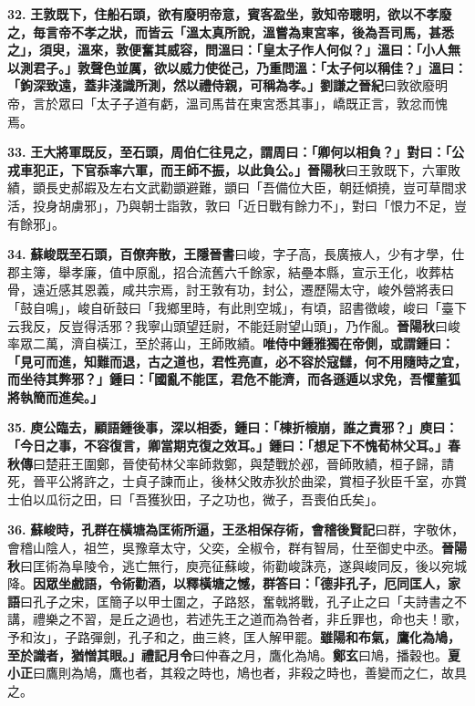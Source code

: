 \textbf{32.} \textbf{王敦既下，住船石頭，欲有廢明帝意，賓客盈坐，敦知帝聰明，欲以不孝廢之，毎言帝不孝之狀，而皆云「溫太真所說，溫嘗為東宮率，後為吾司馬，甚悉之」，須臾，溫來，敦便奮其威容，問溫曰：「皇太子作人何似？」溫曰：「小人無以測君子。」敦聲色並厲，欲以威力使從己，乃重問溫：「太子何以稱佳？」溫曰：「鉤深致遠，蓋非淺識所測，然以禮侍親，可稱為孝。」}{\footnotesize \textbf{劉謙之晉紀}曰敦欲廢明帝，言於眾曰「太子子道有虧，溫司馬昔在東宮悉其事」，嶠既正言，敦忿而愧焉。}

\textbf{33.} \textbf{王大將軍既反，至石頭，周伯仁往見之，謂周曰：「卿何以相負？」對曰：「公戎車犯正，下官忝率六軍，而王師不振，以此負公。」}{\footnotesize \textbf{晉陽秋}曰王敦既下，六軍敗績，顗長史郝嘏及左右文武勸顗避難，顗曰「吾備位大臣，朝廷傾撓，豈可草間求活，投身胡虜邪」，乃與朝士詣敦，敦曰「近日戰有餘力不」，對曰「恨力不足，豈有餘邪」。}

\textbf{34.} \textbf{蘇峻既至石頭，百僚奔散，}{\footnotesize \textbf{王隱晉書}曰峻，字子高，長廣掖人，少有才學，仕郡主簿，舉孝廉，值中原亂，招合流舊六千餘家，結壘本縣，宣示王化，收葬枯骨，遠近感其恩義，咸共宗焉，討王敦有功，封公，遷歷陽太守，峻外營將表曰「鼓自鳴」，峻自斫鼓曰「我鄉里時，有此則空城」，有頃，詔書徵峻，峻曰「臺下云我反，反豈得活邪？我寧山頭望廷尉，不能廷尉望山頭」，乃作亂。\textbf{晉陽秋}曰峻率眾二萬，濟自橫江，至於蔣山，王師敗績。}\textbf{唯侍中鍾雅獨在帝側，或謂鍾曰：「見可而進，知難而退，古之道也，君性亮直，必不容於寇讎，何不用隨時之宜，而坐待其弊邪？」鍾曰：「國亂不能匡，君危不能濟，而各遜遁以求免，吾懼董狐將執簡而進矣。」}

\textbf{35.} \textbf{庾公臨去，顧語鍾後事，深以相委，鍾曰：「棟折榱崩，誰之責邪？」庾曰：「今日之事，不容復言，卿當期克復之效耳。」鍾曰：「想足下不愧荀林父耳。」}{\footnotesize \textbf{春秋傳}曰楚莊王圍鄭，晉使荀林父率師救鄭，與楚戰於邲，晉師敗績，桓子歸，請死，晉平公將許之，士貞子諫而止，後林父敗赤狄於曲梁，賞桓子狄臣千室，亦賞士伯以瓜衍之田，曰「吾獲狄田，子之功也，微子，吾喪伯氏矣」。}

\textbf{36.} \textbf{蘇峻時，孔群在橫塘為匡術所逼，王丞相保存術，}{\footnotesize \textbf{會稽後賢記}曰群，字敬休，會稽山陰人，祖竺，吳豫章太守，父奕，全椒令，群有智局，仕至御史中丞。\textbf{晉陽秋}曰匡術為阜陵令，逃亡無行，庾亮征蘇峻，術勸峻誅亮，遂與峻同反，後以宛城降。}\textbf{因眾坐戲語，令術勸酒，以釋橫塘之憾，群答曰：「德非孔子，厄同匡人，}{\footnotesize \textbf{家語}曰孔子之宋，匡簡子以甲士圍之，子路怒，奮戟將戰，孔子止之曰「夫詩書之不講，禮樂之不習，是丘之過也，若述先王之道而為咎者，非丘罪也，命也夫！歌，予和汝」，子路彈劍，孔子和之，曲三終，匡人解甲罷。}\textbf{雖陽和布氣，鷹化為鳩，至於識者，猶憎其眼。」}{\footnotesize \textbf{禮記月令}曰仲春之月，鷹化為鳩。\textbf{鄭玄}曰鳩，播穀也。\textbf{夏小正}曰鷹則為鳩，鷹也者，其殺之時也，鳩也者，非殺之時也，善變而之仁，故具之。}

